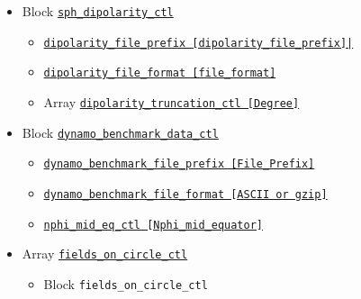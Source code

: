\begin{itemize}
\begin{itemize}
\begin{itemize}
					{\tt pick\_sph\_order\_ctl          [Order]}
		\end{itemize}
%
	\item Block \hyperref[href_t:sph_dipolarity_ctl]{\tt sph\_dipolarity\_ctl}
		\begin{itemize}
		\item \hyperref[href_t:dipolarity_file_prefix]
			{\tt dipolarity\_file\_prefix                    [dipolarity\_file\_prefix]|}
       	\item \hyperref[href_t:dipolarity_file_format]
		    	{\tt dipolarity\_file\_format     [file\_format]}
		\item Array \hyperref[href_t:dipolarity_truncation_ctl]
					{\tt dipolarity\_truncation\_ctl               [Degree]}
		\end{itemize}
%
	\item Block \hyperref[href_t:dynamo_benchmark_data_ctl]
				{\tt dynamo\_benchmark\_data\_ctl}
		\begin{itemize}
			\item \hyperref[href_t:dynamo_benchmark_file_prefix]
					{\tt dynamo\_benchmark\_file\_prefix   [File\_Prefix]}
					\label{href_i:dynamo_benchmark_file_prefix}
			\item \hyperref[href_t:dynamo_benchmark_file_format]
					{\tt dynamo\_benchmark\_file\_format   [ASCII or gzip]}
					\label{href_i:dynamo_benchmark_file_format}
			\item \hyperref[href_t:nphi_mid_eq_ctl]
					{\tt nphi\_mid\_eq\_ctl   [Nphi\_mid\_equator]}
					\label{href_i:nphi_mid_eq_ctl}
		\end{itemize}
%
	\item Array \hyperref[href_t:fields_on_circle_ctl]
				{\tt fields\_on\_circle\_ctl}
		\begin{itemize}
		\item Block {\tt fields\_on\_circle\_ctl}
\end{itemize}
\end{itemize}
\end{itemize}
